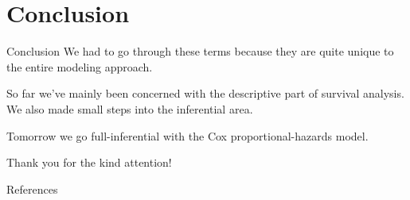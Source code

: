 \documentclass[12pt,english,pdf,xcolor=dvipsnames,aspectratio=169]{beamer}\usepackage[]{graphicx}\usepackage[]{xcolor}
\begin{document}
\section{Conclusion}

\begin{frame}{Conclusion}
We had to go through these terms because they are quite unique to the entire modeling approach.\bigskip

So far we've mainly been concerned with the descriptive part of survival analysis. We also made small steps into the inferential area.\bigskip

Tomorrow we go full-inferential with the Cox proportional-hazards model.
\end{frame}


\begin{frame}
\begin{center}
    \Huge Thank \textcolor{title}{you} for the kind attention!
\end{center}
\end{frame}


\begin{frame}{References}


\end{frame}
\end{document}
